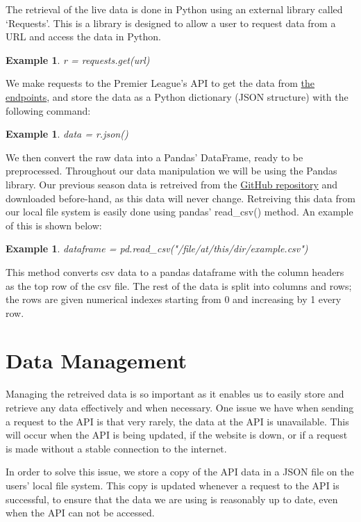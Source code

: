 \documentclass[12pt, a4paper, oneside]{book}
\newtheorem{example}[theorem]{Example}
\numberwithin{equation}{section}
\begin{document}
The retrieval of the live data is done in Python using an external library called `Requests'. This
is a library is designed to allow a user to request data from a URL and access the data in
Python.

\begin{example}
  r = requests.get(url)
\end{example}

We make requests to the Premier League's API to get the data from \hyperref[sec:3.1]{the endpoints}, and
store the data as a Python dictionary (JSON structure) with the following command:

\begin{example}
  data = r.json()
\end{example}

We then convert the raw data into a Pandas' DataFrame, ready to be preprocessed. Throughout our data manipulation we will be using the Pandas library. 
Our previous season data is retreived from the \href{https://github.com/vaastav/Fantasy-Premier-League}{GitHub repository} and downloaded before-hand, as this data will never change. Retreiving this data from our local file system is easily done using pandas' read\_csv() method. An example of this is shown below:

\begin{example}
  dataframe = pd.read\_csv("/file/at/this/dir/example.csv")
\end{example}

This method converts csv data to a pandas dataframe with the column headers as the top row of the csv file. The rest of the data is split into columns and rows; the rows are given numerical indexes starting from 0 and increasing by 1 every row.


\section{Data Management}\label{sec:3.3}

Managing the retreived data is so important as it enables us to easily store and retrieve any
data effectively and when necessary. One issue we have when sending a request to the API
is that very rarely, the data at the API is unavailable. This will occur when the API is being
updated, if the website is down, or if a request is made without a stable connection to the
internet.

In order to solve this issue, we store a copy of the API data in a JSON file on the users'
local file system. This copy is updated whenever a request to the API is successful, to ensure
that the data we are using is reasonably up to date, even when the API can not be accessed.
\end{document}
